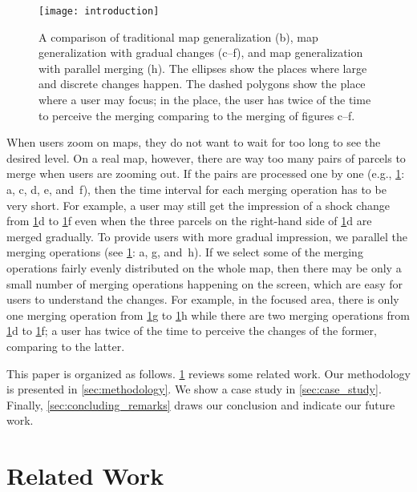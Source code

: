 \documentclass[ijgi,article,submit,moreauthors,pdftex]{Definitions/mdpi}
\begin{document}
\begin{figure}[tb]
\centering
\texttt{[image: introduction]}
\caption{A comparison of traditional map generalization (b),
map generalization with gradual changes (c--f),
and map generalization with parallel merging (h).
The ellipses show the places where large and discrete changes happen.
The dashed polygons show the place where a user may focus;
in the place, the user has twice of the time to perceive the merging
comparing to the merging of figures c--f.
}
\label{fig:intro}
\end{figure}

When users zoom on maps, 
they do not want to wait for too long 
to see the desired level.
On a real map, however, 
there are way too many pairs of parcels to merge 
when users are zooming out.
If the pairs are processed one by one 
(e.g., \fig\ref{fig:intro}: a, c, d, e, and~f),
then the time interval for each merging operation has to be very short.
For example, a user may still get the impression of
a shock change from \fig\ref{fig:intro}d to \fig\ref{fig:intro}f
even when the three parcels on the right-hand side of \fig\ref{fig:intro}d
are merged gradually.
To provide users with more gradual impression, 
we parallel the merging operations
(see \fig\ref{fig:intro}: a, g, and~h).
If we select some of the merging operations
fairly evenly distributed on the whole map, 
then there may be only a small number of merging operations 
happening on the screen,
which are easy for users to understand the changes.
For example, in the focused area, there is only one merging operation 
from \fig\ref{fig:intro}g to \fig\ref{fig:intro}h
while there are two merging operations  
from \fig\ref{fig:intro}d to \fig\ref{fig:intro}f;
a user has twice of the time to perceive the changes of the former,
comparing to the latter.

This paper is organized as follows.
\sect\ref{sec:realted_work} reviews some related work.
Our methodology is presented in \sect\ref{sec:methodology}.
We show a case study in \sect\ref{sec:case_study}.
Finally, \sect\ref{sec:concluding_remarks} draws our conclusion
and indicate our future work.





 
\section{Related Work}
\label{sec:realted_work}
\end{document}
